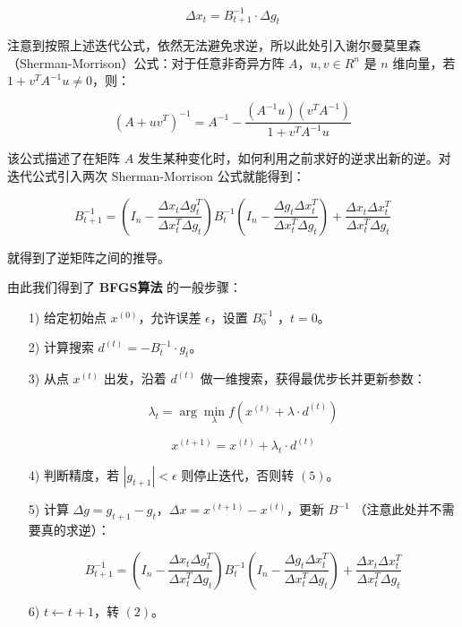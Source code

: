 \documentclass[UTF8]{ctexart}
\begin{document}
\begin{equation}
\Delta x_t=B_{t+1}^{-1}\cdot \Delta g_t
\end{equation}

注意到按照上述迭代公式，依然无法避免求逆，所以此处引入谢尔曼莫里森（Sherman-Morrison）公式：对于任意非奇异方阵 $A$，$u,v \in R^n$ 是 $n$ 维向量，若 $1+v^TA^{-1}u\neq 0$，则：

\begin{equation}
(A+uv^T)^{-1} = A^{-1}-\frac{(A^{-1}u)(v^TA^{-1})}{1+v^TA^{-1}u}
\end{equation}

该公式描述了在矩阵 $A$ 发生某种变化时，如何利用之前求好的逆求出新的逆。对迭代公式引入两次 Sherman-Morrison 公式就能得到：

\begin{equation}
B^{-1}_{t+1}=\left (I_n-\frac{\Delta x_t \Delta g_t^T}{\Delta x_t^T \Delta g_t}\right )B_{t}^{-1}\left (I_n-\frac{\Delta g_t \Delta x_t^T}{\Delta x_t^T \Delta g_t}\right )+\frac{\Delta x_t \Delta x_t^T}{\Delta x_t^T \Delta g_t}
\end{equation}

就得到了逆矩阵之间的推导。 \par

由此我们得到了 \textbf{BFGS算法} 的一般步骤： \par

\begin{itemize}
\item [1)] 给定初始点 $x^(0)$，允许误差 $\epsilon$，设置 $B_0^{-1}$ ，$t = 0$。 
\item [2)] 计算搜索 $d^{(t)}=-B_t^{-1}\cdot g_t$。
\item [3)] 从点 $x^{(t)}$ 出发，沿着 $d^{(t)}$ 做一维搜索，获得最优步长并更新参数：

\begin{equation}
\lambda_t = \arg \min_{\lambda} f(x^{(t)}+\lambda\cdot d^{(t)})
\end{equation}

\begin{equation}
x^{(t+1)}=x^{(t)}+\lambda_t\cdot d^{(t)}
\end{equation}

\item [4)] 判断精度，若 $|g_{t+1}|<\epsilon$  则停止迭代，否则转 $(5)$。

\item [5)] 计算 $\Delta g=g_{t+1}-g_t$，$\Delta x=x^{(t+1)}-x^{(t)}$，更新 $B^{-1}$ （注意此处并不需要真的求逆）：

\begin{equation}
B^{-1}_{t+1}=\left (I_n-\frac{\Delta x_t \Delta g_t^T}{\Delta x_t^T \Delta g_t}\right )B_{t}^{-1}\left (I_n-\frac{\Delta g_t \Delta x_t^T}{\Delta x_t^T \Delta g_t}\right )+\frac{\Delta x_t \Delta x_t^T}{\Delta x_t^T \Delta g_t}
\end{equation}

\item [6)] $t \gets t + 1$，转 $(2)$。

\end{itemize}
\end{document}
